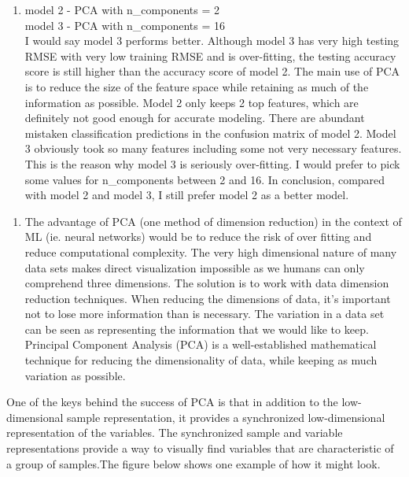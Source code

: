 \documentclass[11pt]{article}
\providecommand{\tightlist}{%
      \setlength{\itemsep}{0pt}\setlength{\parskip}{0pt}}
\begin{document}
    \begin{enumerate}
\def\labelenumi{\alph{enumi})}
\setcounter{enumi}{1}
\tightlist
\item
  model 2 - PCA with n\_components = 2\\
  model 3 - PCA with n\_components = 16\\
  I would say model 3 performs better. Although model 3 has very high
  testing RMSE with very low training RMSE and is over-fitting, the
  testing accuracy score is still higher than the accuracy score of
  model 2. The main use of PCA is to reduce the size of the feature
  space while retaining as much of the information as possible. Model 2
  only keeps 2 top features, which are definitely not good enough for
  accurate modeling. There are abundant mistaken classification
  predictions in the confusion matrix of model 2. Model 3 obviously took
  so many features including some not very necessary features. This is
  the reason why model 3 is seriously over-fitting. I would prefer to
  pick some values for n\_components between 2 and 16. In conclusion,
  compared with model 2 and model 3, I still prefer model 2 as a better
  model.
\end{enumerate}

    \begin{enumerate}
\def\labelenumi{\alph{enumi})}
\setcounter{enumi}{2}
\tightlist
\item
  The advantage of PCA (one method of dimension reduction) in the
  context of ML (ie. neural networks) would be to reduce the risk of
  over fitting and reduce computational complexity. The very high
  dimensional nature of many data sets makes direct visualization
  impossible as we humans can only comprehend three dimensions. The
  solution is to work with data dimension reduction techniques. When
  reducing the dimensions of data, it's important not to lose more
  information than is necessary. The variation in a data set can be seen
  as representing the information that we would like to keep. Principal
  Component Analysis (PCA) is a well-established mathematical technique
  for reducing the dimensionality of data, while keeping as much
  variation as possible.
\end{enumerate}

One of the keys behind the success of PCA is that in addition to the
low-dimensional sample representation, it provides a synchronized
low-dimensional representation of the variables. The synchronized sample
and variable representations provide a way to visually find variables
that are characteristic of a group of samples.The figure below shows one
example of how it might look.
\end{document}
